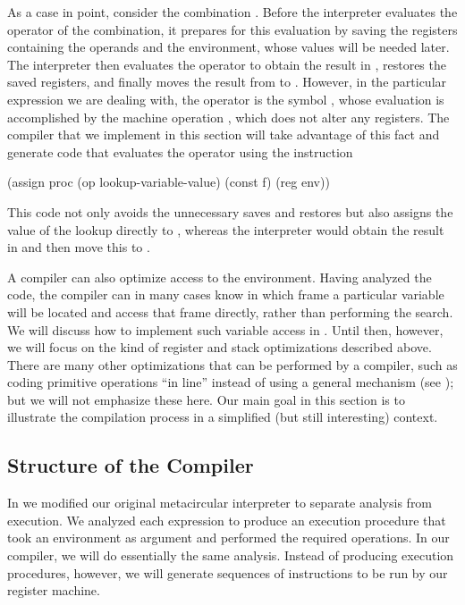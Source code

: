 As a case in point, consider the combination .  Before the
interpreter evaluates the operator of the combination, it prepares for this
evaluation by saving the registers containing the operands and the environment,
whose values will be needed later.  The interpreter then evaluates the operator
to obtain the result in , restores the saved registers, and finally
moves the result from  to .  However, in the particular
expression we are dealing with, the operator is the symbol , whose
evaluation is accomplished by the machine operation
, which does not alter any registers.  The compiler
that we implement in this section will take advantage of this fact and generate
code that evaluates the operator using the instruction

\begin{codeBlock}
(assign proc (op lookup-variable-value)
             (const f)
             (reg env))
\end{codeBlock}

\noindent
This code not only avoids the unnecessary saves and restores but also assigns
the value of the lookup directly to , whereas the interpreter would
obtain the result in  and then move this to .

A compiler can also optimize access to the environment.  Having analyzed the
code, the compiler can in many cases know in which frame a particular variable
will be located and access that frame directly, rather than performing the
 search.  We will discuss how to implement such
variable access in .  Until then, however, we will focus on
the kind of register and stack optimizations described above.  There are many
other optimizations that can be performed by a compiler, such as coding
primitive operations ``in line'' instead of using a general 
mechanism (see ); but we will not emphasize these here.  Our
main goal in this section is to illustrate the compilation process in a
simplified (but still interesting) context.



\subsection{Structure of the Compiler}
\label{Section 5.5.1}

In  we modified our original metacircular interpreter to
separate analysis from execution.  We analyzed each expression to produce an
execution procedure that took an environment as argument and performed the
required operations.  In our compiler, we will do essentially the same
analysis.  Instead of producing execution procedures, however, we will generate
sequences of instructions to be run by our register machine.

